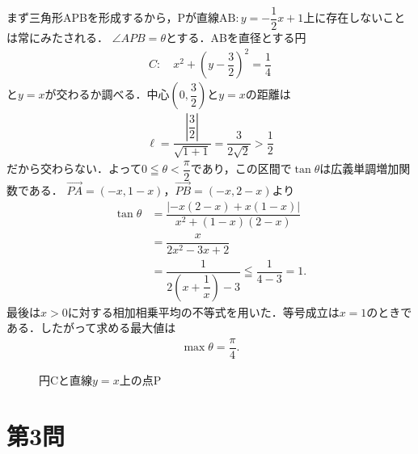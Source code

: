 \documentclass[../main.tex]{subfiles}
\begin{document}
まず三角形APBを形成するから，Pが直線$\mathrm{AB}:y=-\dfrac{1}{2}x+1$上に存在しないことは常にみたされる．
$\angle APB=\theta$とする．ABを直径とする円
\begin{align}
  C:\quad x^2+\left(y-\dfrac{3}{2}\right)^2=\dfrac{1}{4}
\end{align}
と$y=x$が交わるか調べる．中心$(0,\dfrac{3}{2})$と$y=x$の距離は
\begin{align}
  \ell=\dfrac{|\dfrac{3}{2}|}{\sqrt{1+1}}=\dfrac{3}{2\sqrt{2}}>\dfrac{1}{2}
\end{align}
だから交わらない．よって$0\leqq\theta<\dfrac{\pi}{2}$であり，この区間で$\tan\theta$は広義単調増加関数である．
$\overrightarrow{PA}=(-x,1-x)$，$\overrightarrow{PB}=(-x,2-x)$より
\begin{align}
  \tan\theta&=\dfrac{|{-x(2-x)+x(1-x)}|}{x^2+(1-x)(2-x)}\\
  &=\dfrac{x}{2x^2-3x+2}\\
  &=\dfrac{1}{2(x+\dfrac{1}{x})-3}\leqq\dfrac{1}{4-3}=1.
\end{align}
最後は$x>0$に対する相加相乗平均の不等式を用いた．等号成立は$x=1$のときである．したがって求める最大値は
\begin{align}
  \max\theta=\dfrac{\pi}{4}.
\end{align}
\begin{figure}[H]
  \begin{center}
  \end{center}
  \caption{円Cと直線$y=x$上の点P}
\end{figure}
\newpage

\section*{第3問}
\end{document}
